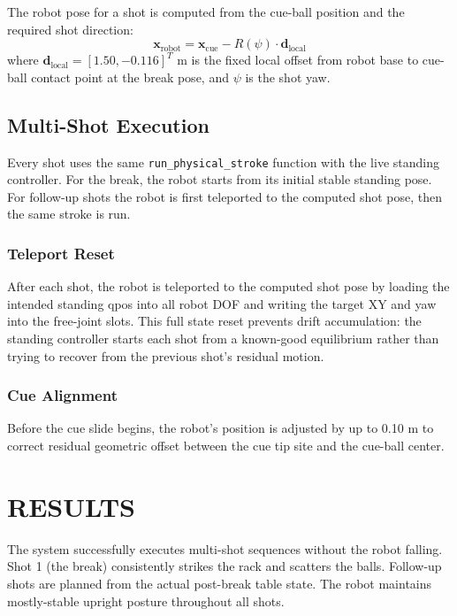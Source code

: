 \documentclass[letterpaper, 12 pt, conference]{ieeeconf}
\begin{document}
The robot pose for a shot is computed from the cue-ball position and the required
shot direction:
\begin{equation}
  \mathbf{x}_\text{robot} = \mathbf{x}_\text{cue}
    - R(\psi) \cdot \mathbf{d}_\text{local}
\end{equation}
where $\mathbf{d}_\text{local} = [1.50, -0.116]^T$ m is the fixed local offset
from robot base to cue-ball contact point at the break pose, and $\psi$ is the
shot yaw.

\subsection{Multi-Shot Execution}

Every shot uses the same \texttt{run\_physical\_stroke} function with the live
standing controller. For the break, the robot starts from its initial
stable standing pose. For follow-up shots the robot is first teleported to the
computed shot pose, then the same stroke is run.

\subsubsection{Teleport Reset}

After each shot, the robot is teleported to the computed shot pose by loading
the intended standing qpos into all
robot DOF and writing the target XY and yaw into the free-joint slots. This full
state reset prevents drift accumulation: the standing controller starts each
shot from a known-good equilibrium rather than trying to recover from the
previous shot's residual motion.

\subsubsection{Cue Alignment}

Before the cue slide begins, the
robot's position is adjusted by up to 0.10 m to correct residual geometric
offset between the cue tip site and the cue-ball center.

\section{RESULTS}

The system successfully executes multi-shot sequences without the robot falling.
Shot 1 (the break) consistently strikes the rack and scatters the balls. Follow-up shots are planned from the actual
post-break table state. The robot
maintains mostly-stable upright posture throughout all shots.
\end{document}

